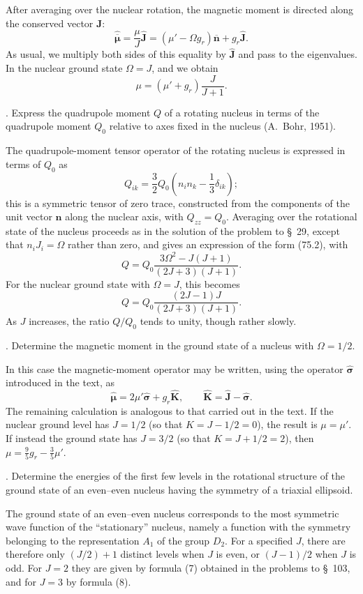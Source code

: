 After averaging over the nuclear rotation, the magnetic moment is directed
along the conserved vector $\mathbf J$:
\[
 \hat{\overline{\boldsymbol\mu}}
 =\frac\mu J\hat{\mathbf J}
 =(\mu'-\Omega g_r)\overline{\mathbf n}+g_r\hat{\mathbf J}.
\]
As usual, we multiply both sides of this equality by $\hat{\mathbf J}$ and
pass to the eigenvalues. In the nuclear ground state $\Omega=J$, and we obtain
\begin{equation}
 \mu=(\mu'+g_r)\frac{J}{J+1}.
 \tag{119.6}
\end{equation}

. Express the quadrupole moment $Q$ of a rotating nucleus in terms
of the quadrupole moment $Q_0$ relative to axes fixed in the nucleus (A.~Bohr,
1951).

\SolutionHeading The quadrupole-moment tensor operator of the rotating nucleus
is expressed in terms of $Q_0$ as
\[
 Q_{ik}=\frac32Q_0\left(n_in_k-\frac13\delta_{ik}\right);
\]
this is a symmetric tensor of zero trace, constructed from the components of
the unit vector $\mathbf n$ along the nuclear axis, with $Q_{zz}=Q_0$.
Averaging over the rotational state of the nucleus proceeds as in the solution
of the problem to \S~29, except that $n_iJ_i=\Omega$ rather than zero, and
gives an expression of the form (75.2), with
\[
 Q=Q_0\frac{3\Omega^2-J(J+1)}{(2J+3)(J+1)}.
\]
For the nuclear ground state with $\Omega=J$, this becomes
\[
 Q=Q_0\frac{(2J-1)J}{(2J+3)(J+1)}.
\]
As $J$ increases, the ratio $Q/Q_0$ tends to unity, though rather slowly.

. Determine the magnetic moment in the ground state of a nucleus
with $\Omega=1/2$.

\SolutionHeading In this case the magnetic-moment operator may be written,
using the operator $\hat{\boldsymbol\sigma}$ introduced in the text, as
\[
 \hat{\boldsymbol\mu}=2\mu'\hat{\boldsymbol\sigma}+g_r\hat{\mathbf K},
 \qquad \hat{\mathbf K}=\hat{\mathbf J}-\hat{\boldsymbol\sigma}.
\]
The remaining calculation is analogous to that carried out in the text. If
the nuclear ground level has $J=1/2$ (so that $K=J-1/2=0$), the result is
$\mu=\mu'$. If instead the ground state has $J=3/2$ (so that
$K=J+1/2=2$), then $\mu=\frac95g_r-\frac35\mu'$.

. Determine the energies of the first few levels in the rotational
structure of the ground state of an even--even nucleus having the symmetry of
a triaxial ellipsoid.

\SolutionHeading The ground state of an even--even nucleus corresponds to the
most symmetric wave function of the ``stationary'' nucleus, namely a function
with the symmetry belonging to the representation $A_1$ of the group $D_2$.
For a specified $J$, there are therefore only $(J/2)+1$ distinct levels when
$J$ is even, or $(J-1)/2$ when $J$ is odd. For $J=2$ they are given by formula
(7) obtained in the problems to \S~103, and for $J=3$ by formula (8).
